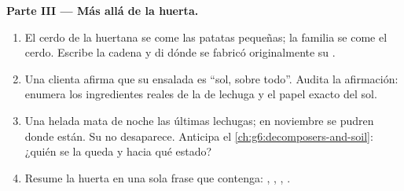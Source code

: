 \begin{problem}
\medskip\noindent\textbf{Parte III --- Más allá de la huerta.}
\begin{enumerate}[resume]
  \item El cerdo de la huertana se come las patatas pequeñas; la
        familia se come el cerdo. Escribe la cadena y di dónde se
        fabricó originalmente su .
  \item Una clienta afirma que su ensalada es ``sol, sobre todo''.
        Audita la afirmación: enumera los ingredientes reales de la
         de lechuga y el papel exacto del sol.
  \item Una helada mata de noche las últimas lechugas; en noviembre se
        pudren donde están. Su  no desaparece.
        Anticipa el \cref{ch:g6:decomposers-and-soil}: ¿quién se la
        queda y hacia qué estado?
  \item Resume la huerta en una sola frase que contenga: ,
        , , .
\end{enumerate}
\end{problem}
